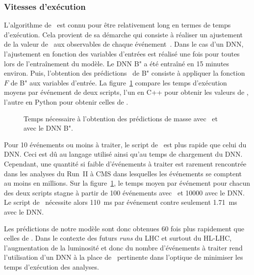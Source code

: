 \subsubsection{Vitesses d'exécution}
L'algorithme de \SVFIT\ est connu pour être relativement long en termes de temps d'exécution.
Cela provient de sa démarche
qui consiste à réaliser un ajustement de la valeur de \msv\ aux observables de chaque événement~\cite{SVFit_Bianchini_2014}.
Dans le cas d'un DNN, l'ajustement en fonction des variables d'entrées est réalisé une fois pour toutes lors de l'entraînement du modèle.
Le DNN B" a été entraîné en 15 minutes environ.
Puis, l'obtention des prédictions \mml\ de B" consiste à appliquer la fonction $F$ de B" aux variables d'entrée.
La figure~\ref{fig-SVFIT_vs_DNN_time}
compare les temps d'exécution moyens par événement de deux scripts,
l'un en C++ pour obtenir les valeurs de \msv,
l'autre en Python pour obtenir celles de \mml.
\begin{figure}[h]
\centering

\caption{Temps nécessaire à l'obtention des prédictions de masse avec \SVFIT\ et avec le DNN B".}
\label{fig-SVFIT_vs_DNN_time}
\end{figure}
\par
Pour 10 événements ou moins à traiter,
le script de \SVFIT\ est plus rapide que celui du DNN.
Ceci est dû au langage utilisé ainsi qu'au temps de chargement du DNN.
Cependant, une quantité si faible d'événements à traiter est rarement rencontrée dans les analyses du Run~II à CMS
dans lesquelles les événements se comptent au moins en millions.
Sur la figure~\ref{fig-SVFIT_vs_DNN_time},
le temps moyen par événement
pour chacun des deux scripts stagne à partir de
\num{100} événements avec \SVFIT\
et
\num{10000} avec le DNN.
Le script de \SVFIT\ nécessite alors \SI{110}{\milli\second} par événement
contre
seulement \SI{1.71}{\milli\second} avec le DNN.
\par
Les prédictions de notre modèle sont donc obtenues 60 fois plus rapidement que celles de \SVFIT.
Dans le contexte des futurs \emph{runs} du LHC et surtout du HL-LHC,
l'augmentation de la luminosité et donc du nombre d'événements à traiter
rend l'utilisation d'un DNN à la place de \SVFIT\ pertinente dans l'optique de minimiser les temps d'exécution des analyses.